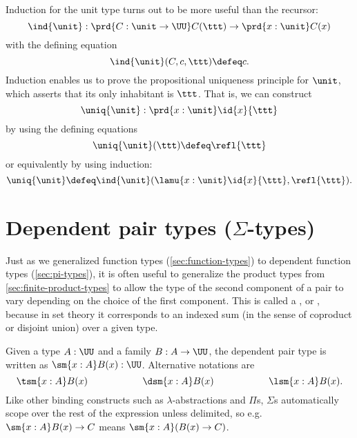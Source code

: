 
Induction for the unit type turns out to be more useful than the
recursor: 
%
\[ \ind{\unit} : \prd{C:\unit \to \UU} C(\ttt) \to \prd{x:\unit}C(x)\]
with the defining equation
\[ \ind{\unit}(C,c,\ttt) \defeq c. \]
Induction enables us to prove the propositional uniqueness principle for $\unit$, which asserts that its only inhabitant is $\ttt$.
That is, we can construct
\label{uniquenessunit}
\[\uniq{\unit} : \prd{x:\unit} \id{x}{\ttt} \]
by using the defining equations
\[\uniq{\unit}(\ttt) \defeq \refl{\ttt} \]
or equivalently by using induction:
\[\uniq{\unit} \defeq \ind{\unit}(\lamu{x:\unit} \id{x}{\ttt},\refl{\ttt}). \]

%
%

\section{Dependent pair types (\texorpdfstring{$\Sigma$}{Σ}-types)}
\label{sec:sigma-types}

%
%
%
%
%

Just as we generalized function types (\cref{sec:function-types}) to dependent function types (\cref{sec:pi-types}), it is often useful to generalize the product types from \cref{sec:finite-product-types} to allow the type of
the second component of a pair to vary depending on the choice of the first
component. This is called a , or , because in set theory it
corresponds to an indexed sum (in the sense of coproduct or
disjoint union) over a given type.

Given a type $A:\UU$ and a family $B : A \to \UU$, the dependent
pair type is written as $\sm{x:A} B(x) : \UU$.
Alternative notations are 
\[ \tsm{x:A} B(x) \hspace{2cm} \dsm{x:A}B(x) \hspace{2cm} \lsm{x:A} B(x). \]
Like other binding constructs such as $\lambda$-abstractions and $\Pi$s, $\Sigma$s automatically scope over the rest of the expression unless delimited, so e.g.\ $\sm{x:A} B(x) \to C$ means $\sm{x:A} (B(x) \to C)$.

